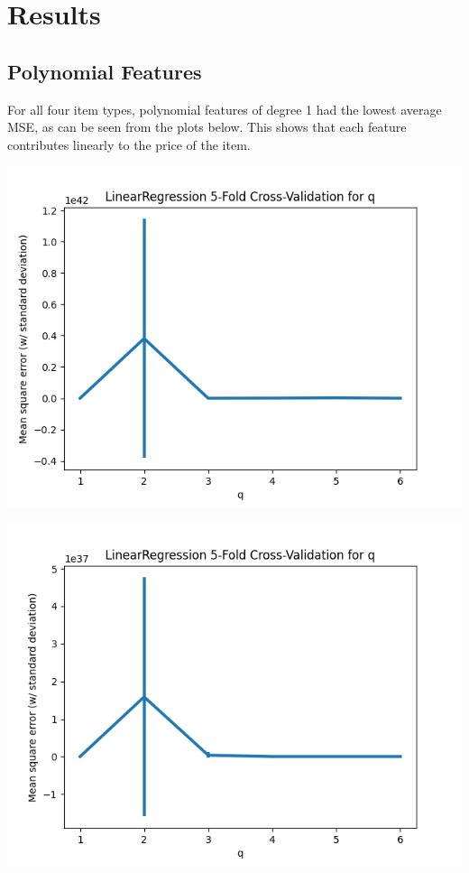 \documentclass[10pt]{article}
\begin{document}
\section{Results}
	\subsection{Polynomial Features}
			For all four item types, polynomial features of degree 1 had the lowest average MSE, as can be seen from the plots below. This shows that each feature contributes linearly to the price of the item.
			
			\begin{minipage}{0.3\linewidth}
				\includegraphics[width=\linewidth]{../graphs/stasis_webifier_linreg_polyfeatures_crossval.png}
			\end{minipage}%
			\begin{minipage}{0.3\linewidth}
				\includegraphics[width=\linewidth]{../graphs/shield_booster_linreg_polyfeatures_crossval.png}
			\end{minipage}
		
\end{document}
